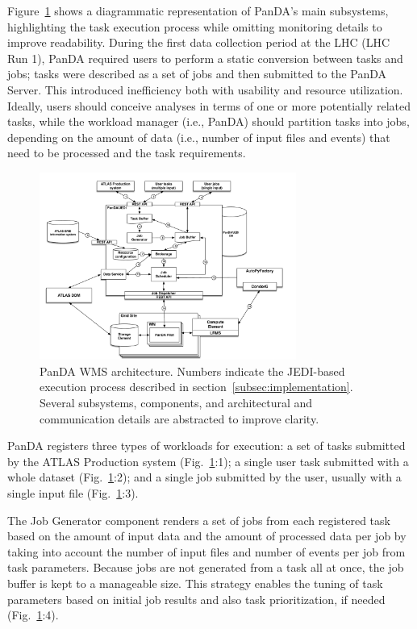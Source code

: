 Figure~\ref{fig:architecture} shows a diagrammatic representation of PanDA's
main subsystems, highlighting the task execution process while omitting
monitoring details to improve readability. During the first data collection
period at the LHC (LHC Run 1), PanDA required users to perform a static
conversion between tasks and jobs; tasks were described as a set of jobs and
then submitted to the PanDA Server. This introduced inefficiency both with
usability and resource utilization. Ideally, users should conceive analyses in
terms of one or more potentially related tasks, while the workload manager
(i.e., PanDA) should partition tasks into jobs, depending on the amount of data
(i.e., number of input files and events) that need to be processed and the task
requirements.

\begin{figure}
  \includegraphics[width=0.75\textwidth]{images/PanDA_WMS.pdf}
  \caption{PanDA WMS architecture. Numbers indicate the JEDI-based execution
           process described in section~\ref{subsec:implementation}. Several
           subsystems, components, and architectural and communication details
           are abstracted to improve clarity.}
  \label{fig:architecture}
\end{figure}

PanDA registers three types of workloads for execution: a set of tasks
submitted by the ATLAS Production system (Fig.~\ref{fig:architecture}:1); a
single user task submitted with a whole dataset
(Fig.~\ref{fig:architecture}:2); and a single job submitted by the user,
usually with a single input file (Fig.~\ref{fig:architecture}:3).

The Job Generator component renders a set of jobs from each registered task
based on the amount of input data and the amount of processed data per job by
taking into account the number of input files and number of events per job from
task parameters. Because jobs are not generated from a task all at once, the
job buffer is kept to a manageable size. This strategy enables the tuning of
task parameters based on initial job results and also task prioritization, if
needed (Fig.~\ref{fig:architecture}:4).

